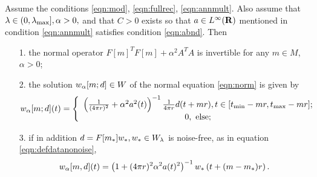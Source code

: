 \begin{proposition}
  \label{thm:norminvexp}
  Assume the conditions \ref{eqn:mod}, \ref{eqn:fullrec},
  \ref{eqn:annmult}. Also assume that $\lambda \in (0,\lambda_{\rm
    max}], \alpha > 0,$ and that  $C>0$ exists so that $a \in L^{\infty}({\bf R})$
  mentioned in condition \ref{eqn:annmult} satisfies condition
  \ref{eqn:abnd}.
  Then
  \begin{itemize}
  \item[1. ]the normal operator $F[m]^TF[m] + \alpha^2A^TA$ is
    invertible for any $m \in M$, $\alpha > 0$;
  \item[2. ]the solution $w_{\alpha}[m;d]\in W$ of the normal equation
    \ref{eqn:norm} is given by
    \begin{equation}
      \label{eqn:normsol}
      w_{\alpha}[m;d](t) = \left\{
        \begin{array}{c}
          \left(\frac{1}{(4\pi r)^2} + \alpha^2
          a^2(t)\right)^{-1}\frac{1}{4 \pi r}d(t+mr), t \in [t_{\rm
          min}-mr, t_{\rm max}-mr];\\
          0, \mbox{ else;}
        \end{array}
      \right.
    \end{equation}
  \item[3. ]if in addition $d=F[m_*]w_*, w_* \in W_{\lambda}$ is noise-free, as in equation
    \ref{eqn:defdatanonoise},
    \begin{equation}
      \label{eqn:solnonoise}
      w_{\alpha}[m,d](t)= \left(1+ (4\pi r)^2\alpha^2 a(t)^2\right)^{-1}w_*\left(t+(m-m_*)r\right).
    \end{equation}
  \end{itemize}
\end{proposition}

